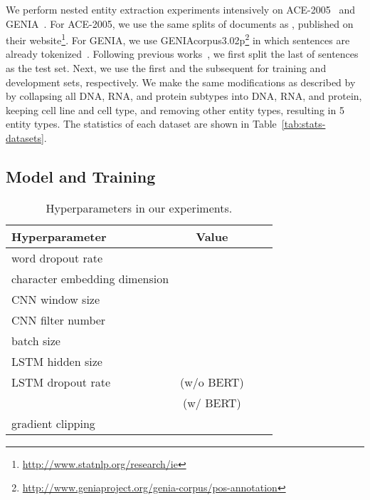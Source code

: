 \documentclass[11pt,a4paper]{article}
\def\tabref#1{Table~\ref{#1}}
\begin{document}
We perform nested entity extraction experiments intensively on ACE-2005~\cite{doddington-etal-2004-automatic} and GENIA~\cite{Kim:2003}.
For ACE-2005, we use the same splits of documents as \citet{lu-roth-2015-joint}, published on their website\footnote{\url{http://www.statnlp.org/research/ie}}.
For GENIA, we use GENIAcorpus3.02p\footnote{\url{http://www.geniaproject.org/genia-corpus/pos-annotation}} in which sentences are already tokenized~\cite{tateisi-tsujii-2004-part}.
Following previous works~\cite{finkel-manning-2009-nested,lu-roth-2015-joint}, we first split the last  of sentences as the test set.
Next, we use the first  and the subsequent  for training and development sets, respectively.
We make the same modifications as described by \citet{finkel-manning-2009-nested} by collapsing all DNA, RNA, and protein subtypes into DNA, RNA, and protein, keeping cell line and cell type, and removing other entity types, resulting in 5 entity types.
The statistics of each dataset are shown in \tabref{tab:stats-datasets}.

\subsection{Model and Training}

\begin{table}[t!]
\centering
\small
\begin{tabular}{l|ccc}
  {\bf Hyperparameter} & {\bf Value} \\
  \hline
  word dropout rate &  \\
  character embedding dimension &  \\
  CNN window size &  \\
  CNN filter number &  \\
  \hline
  batch size &  \\
  LSTM hidden size &  \\
  LSTM dropout rate &  (w/o BERT) \\
   &  (w/ BERT) \\
  gradient clipping &  \\
\end{tabular}
\caption{Hyperparameters in our experiments.}\label{tab:hyperparameters}
\end{table}
\end{document}
